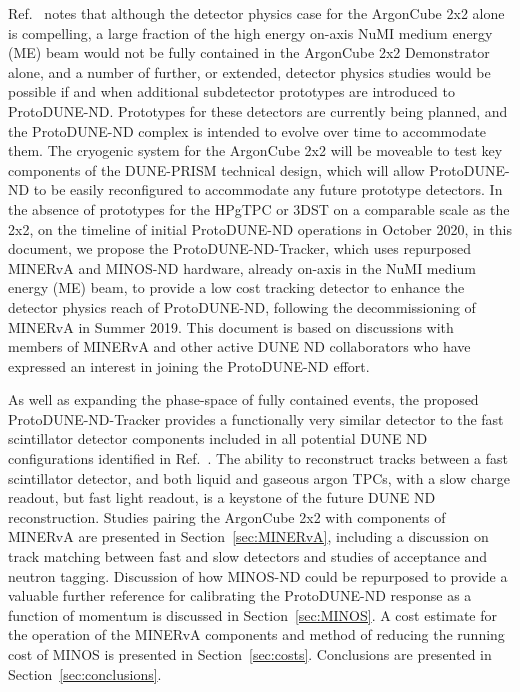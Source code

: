 Ref.~\cite{2x2@FNAL} notes that although the detector physics case for the ArgonCube 2x2 alone is compelling, a large fraction of the high energy on-axis NuMI medium energy (ME) beam would not be fully contained in the ArgonCube 2x2 Demonstrator alone, and a number of further, or extended, detector physics studies would be possible if and when additional subdetector prototypes are introduced to ProtoDUNE-ND. Prototypes for these detectors are currently being planned, and the ProtoDUNE-ND complex is intended to evolve over time to accommodate them. The cryogenic system for the ArgonCube 2x2 will be moveable to test key components of the DUNE-PRISM technical design, which will allow ProtoDUNE-ND to be easily reconfigured to accommodate any future prototype detectors. In the absence of prototypes for the HPgTPC or 3DST on a comparable scale as the 2x2, on the timeline of initial ProtoDUNE-ND operations in October 2020, in this document, we propose the ProtoDUNE-ND-Tracker, which uses repurposed MINERvA and MINOS-ND hardware, already on-axis in the NuMI medium energy (ME) beam, to provide a low cost tracking detector to enhance the detector physics reach of ProtoDUNE-ND, following the decommissioning of MINERvA in Summer 2019. This document is based on discussions with members of MINERvA and other active DUNE ND collaborators who have expressed an interest in joining the ProtoDUNE-ND effort.

As well as expanding the phase-space of fully contained events, the proposed ProtoDUNE-ND-Tracker provides a functionally very similar detector to the fast scintillator detector components included in all potential DUNE ND configurations identified in Ref.~\cite{dune_ndcsg}. The ability to reconstruct tracks between a fast scintillator detector, and both liquid and gaseous argon TPCs, with a slow charge readout, but fast light readout, is a keystone of the future DUNE ND reconstruction. Studies pairing the ArgonCube 2x2 with components of MINERvA are presented in Section~\ref{sec:MINERvA}, including a discussion on track matching between fast and slow detectors and studies of acceptance and neutron tagging. Discussion of how MINOS-ND could be repurposed to provide a valuable further reference for calibrating the ProtoDUNE-ND response as a function of momentum is discussed in Section~\ref{sec:MINOS}. A cost estimate for the operation of the MINERvA components and method of reducing the running cost of MINOS is presented in Section~\ref{sec:costs}. Conclusions are presented in Section~\ref{sec:conclusions}.

